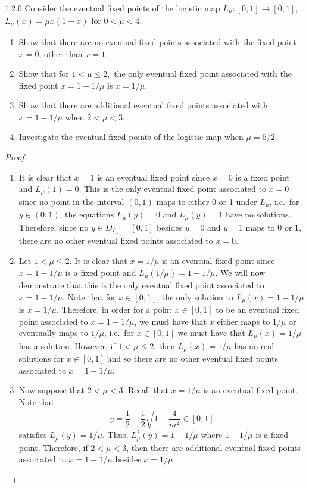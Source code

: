 \begin{problem}{1.2.6}
  Consider the eventual fixed points of the logistic map $L_{\mu}: [0,1] \to [0,1]$,
  $L_\mu(x)  = \mu x (1-x)$ for $0 < \mu < 4$.
  \begin{enumerate}
    \item Show that there are no eventual fixed points associated with the fixed
      point $x=0$, other than $x=1$.
    \item Show that for $1 < \mu \leq 2,$ the only eventual fixed point associated
      with the fixed point $x = 1 - 1/\mu$ is $x = 1/\mu$.
    \item Show that there are additional eventual fixed points associated with $x = 1 - 1/\mu$
      when $2 < \mu < 3$.
    \item Investigate the eventual fixed points of the logistic map when $\mu = 5/2$.
  \end{enumerate}
\end{problem}

\begin{proof}
  \begin{enumerate}
    \item It is clear that $x=1$ is an eventual fixed
      point since $x=0$ is a fixed point and $L_\mu(1) = 0$.
      This is the only eventual fixed point associated to $x=0$ since no point
      in the interval $(0, 1)$ maps to either 0 or 1 under $L_\mu$, i.e.\
      for $y\in(0,1)$, the equations $L_\mu(y) = 0$ and $L_\mu(y) = 1$
      have no solutions. Therefore, since no $y \in D_{L_\mu} = [0, 1]$ besides
      $y=0$ and $y=1$ maps to 0 or 1, there are no other eventual fixed points
      associated to $x=0$.
    \item Let $1 < \mu \leq 2$. It is clear that $x = 1/\mu$ is an eventual
      fixed point since $x = 1 - 1/\mu$ is a fixed point and
      $L_\mu(1/\mu) = 1 - 1/\mu$.
      We will now demonstrate that this is the only eventual fixed point
      associated to $x = 1 - 1/\mu$. Note that
      for $x \in [0, 1]$, the only solution to $L_\mu(x) = 1 - 1/\mu$ is $x = 1/\mu$.
      Therefore, in order for a point $x \in [0, 1]$ to be an eventual fixed point
      associated to $x = 1 - 1/\mu$, we must have that $x$ either maps to $1/\mu$
      or eventually maps to $1/\mu$, i.e.\ for $x \in [0, 1]$ we must have that
      $L_\mu(x) = 1/\mu$ has a solution. However, if $1 < \mu \leq 2$,
      then $L_\mu(x) = 1/\mu$ has no real solutions for $x \in [0, 1]$ and  so
      there are no other eventual fixed points associated to $x = 1 - 1/\mu$.
    \item Now suppose that $2 < \mu < 3$. Recall that $x = 1/\mu$ is an eventual fixed point.
      Note that
      $$y = \frac{1}{2} - \frac{1}{2}\sqrt{1 - \frac{4}{m^2}} \in [0, 1]$$
      satisfies $L_\mu(y) = 1/\mu$. Thus, $L_\mu^2(y) = 1 - 1/\mu$ where $1 - 1/\mu$ is a fixed point.
      Therefore, if $2 < \mu < 3$, then there are additional eventual fixed points associated
      to $x = 1 - 1/\mu$ besides $x = 1/\mu$.
  \end{enumerate}
\end{proof}
\newpage

